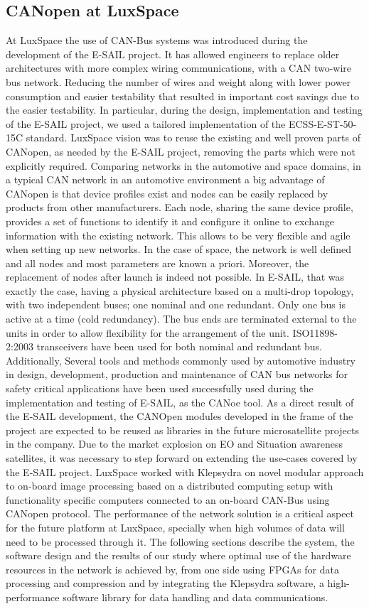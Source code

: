 \documentclass[a4paper,twocolumn]{esapub2005} %
\begin{document}
\subsection{CANopen at LuxSpace}
At LuxSpace the use of CAN-Bus systems was introduced during the development of the E-SAIL project. It has allowed engineers to replace older architectures with more complex wiring communications, with a CAN two-wire bus network. Reducing the number of wires and weight along with lower power consumption and easier testability that resulted in important cost savings due to the easier testability. In particular, during the design, implementation and testing of the E-SAIL project, we used a tailored implementation of the ECSS-E-ST-50-15C standard. LuxSpace vision was to reuse the existing and well proven parts of CANopen, as needed by the E-SAIL project, removing the parts which were not explicitly required. Comparing networks in the automotive and space domains, in a typical CAN network in an automotive environment a big advantage of CANopen is that device profiles exist and nodes can be easily replaced by products from other manufacturers. Each node, sharing the same device profile, provides a set of functions to identify it and configure it online to exchange information with the existing network. This allows to be very flexible and agile when setting up new networks. In the case of space, the network is well defined and all nodes and most parameters are known a priori. Moreover, the replacement of nodes after launch is indeed not possible. In E-SAIL, that was exactly the case, having a physical architecture based on a multi-drop topology, with two independent buses; one nominal and one redundant. Only one bus is active at a time (cold redundancy). The bus ends are terminated external to the units in order to allow flexibility for the arrangement of the unit. ISO11898-2:2003 transceivers have been used for both nominal and redundant bus. Additionally, Several tools and methods commonly used by automotive industry in design, development, production and maintenance of CAN bus networks for safety critical applications have been used successfully used during the implementation and testing of E-SAIL, as the CANoe tool. As a direct result of the E-SAIL development, the CANOpen modules developed in the frame of the project are expected to be reused as libraries in the future microsatellite projects in the company. Due to the market explosion on EO and Situation awareness satellites, it was necessary to step forward on extending the use-cases covered by the E-SAIL project. LuxSpace worked with Klepsydra on novel modular approach to on-board image processing based on a distributed computing setup with functionality specific computers connected to an on-board CAN-Bus using CANopen protocol. The performance of the network solution is a critical aspect for the future platform at LuxSpace, specially when high volumes of data will need to be processed through it. The following sections describe the system, the software design and the results of our study where optimal use of the hardware resources in the network is achieved by, from one side using FPGAs for data processing and compression and by integrating the Klepsydra software, a high-performance software library for data handling and data communications.
\end{document}
